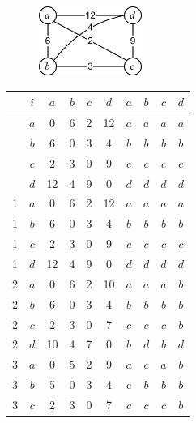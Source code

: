 \begin{figure}[h]
\centering
\includegraphics[width=0.3\textwidth]{graphics/floyd.png}
\end{figure}

\begin{table}[h]
\centering
\begin{tabular}{c|c|cccc|cccc}
& $i$ & $a$ & $b$ & $c$ & $d$ & $a$ & $b$ & $c$ & $d$\\
\hline
& $a$ & 0  & 6 & 2 & 12 & $a$ & $a$ & $a$ & $a$\\ 
& $b$ & 6  & 0 & 3 & 4  & $b$ & $b$ & $b$ & $b$\\
& $c$ & 2  & 3 & 0 & 9  & $c$ & $c$ & $c$ & $c$\\
& $d$ & 12 & 4 & 9 & 0  & $d$ & $d$ & $d$ & $d$\\
\hline
1 & $a$ & {\color{red}0}  & {\color{red}6} & {\color{red}2} & {\color{red}12} & {\color{red}$a$} & {\color{red}$a$} & {\color{red}$a$} & {\color{red}$a$}\\ 
1 & $b$ & {\color{red}6}  & 0 & 3 & 4  & $b$ & $b$ & $b$ & $b$\\
1 & $c$ & {\color{red}2}  & 3 & 0 & 9  & $c$ & $c$ & $c$ & $c$\\
1 & $d$ & {\color{red}12} & 4 & 9 & 0  & $d$ & $d$ & $d$ & $d$\\
\hline
2 & $a$ & 0  & {\color{red}6} & 2 & {\color{blue}10} & $a$ & $a$ & $a$ & {\color{blue}$b$}\\ 
2 & $b$ & {\color{red}6}  & {\color{red}0} & {\color{red}3} & {\color{red}4} & {\color{red}$b$} & {\color{red}$b$} & {\color{red}$b$} & {\color{red}$b$}\\
2 & $c$ & 2  & {\color{red}3} & 0 & {\color{blue}7}  & $c$ & $c$ & $c$ & {\color{blue}$b$}\\
2 & $d$ & {\color{blue}10} & {\color{red}4} & {\color{blue}7} & 0  & {\color{blue}$b$} & $d$ & {\color{blue}$b$} & $d$\\
\hline
3 & $a$ & 0  & {\color{blue}5} & {\color{red}2} & {\color{blue}9} & $a$ & {\color{blue}$c$} & $a$ & $b$\\
3 & $b$ & {\color{blue}5}  & 0 & {\color{red}3} & 4  & {\color{blue}c} & $b$ & $b$ & $b$\\
3 & $c$ & {\color{red}2}  & {\color{red}3} & {\color{red}0} & {\color{red}7}  & {\color{red}$c$} & {\color{red}$c$} & {\color{red}$c$} & {\color{red}$b$}\\

\end{tabular}
\end{table}
